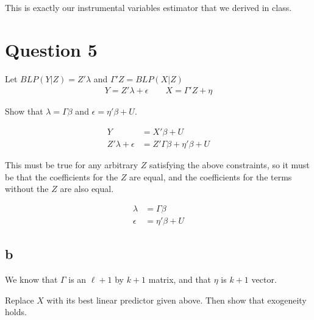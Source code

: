 \documentclass[12pt]{paper}
\begin{document}
This is exactly our instrumental variables estimator that we derived
in class. 

\section*{Question 5}

Let $BLP( Y \vert Z) = Z'\lambda$ and $\Gamma'Z = BLP(X \vert Z)$
\begin{align*}
  Y = Z'\lambda + \epsilon \quad\quad X = \Gamma'Z + \eta
\end{align*}

Show that $\lambda = \Gamma \beta$ and $\epsilon = \eta'\beta + U$.

\begin{align*}
  Y &= X'\beta + U \\
  Z'\lambda + \epsilon &= Z' \Gamma \beta  + \eta' \beta + U
\end{align*}

This must be true for any arbitrary $Z$ satisfying the above
constraints, so it must be that the coefficients for the $Z$ are
equal, and the coefficients for the terms without the $Z$ are also
equal.

\begin{align*}
  \lambda &= \Gamma\beta\\
  \epsilon &= \eta' \beta + U
\end{align*}

\subsection*{b}

We know that $\Gamma$ is an $\ell+1$ by $k+1$ matrix, and that $\eta$ is $k+1$
vector.

Replace $X$ with its best linear predictor given above. Then show that
exogeneity holds.
\end{document}
